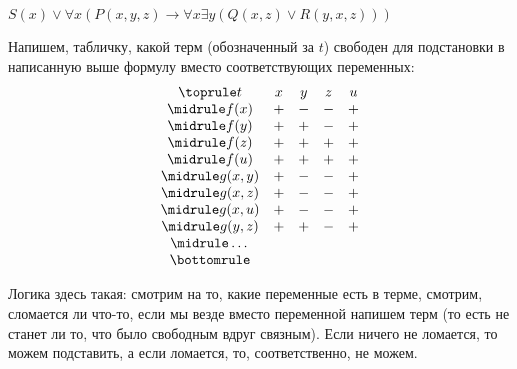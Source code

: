 \documentclass[main]{subfiles}
\begin{document}
\begin{example}
    $S(x) \lor \forall x(P(x,y,z) \to \forall x\exists y(Q(x,z) \lor R(y,x,z)))$

    Напишем, табличку, какой терм (обозначенный за $t$) свободен для подстановки в написанную выше формулу вместо соответствующих переменных:
    \[\begin{array}{*5{c}}
            \toprule
            t       & x & y & z & u \\
            \midrule
            f(x)    & + & - & - & + \\
            \midrule
            f(y)    & + & + & - & + \\
            \midrule
            f(z)    & + & + & + & + \\
            \midrule
            f(u)    & + & + & + & + \\
            \midrule
            g(x, y) & + & - & - & + \\
            \midrule
            g(x, z) & + & - & - & + \\
            \midrule
            g(x, u) & + & - & - & + \\
            \midrule
            g(y, z) & + & + & - & + \\
            \midrule
            \dots   &   &   &   &   \\
            \bottomrule
        \end{array}\]

    Логика здесь такая: смотрим на то, какие переменные есть в терме, смотрим, сломается ли что-то, если мы везде вместо переменной напишем терм (то есть не станет ли то, что было свободным вдруг связным). Если ничего не ломается, то можем подставить, а если ломается, то, соответственно, не можем.
\end{example}
\end{document}
